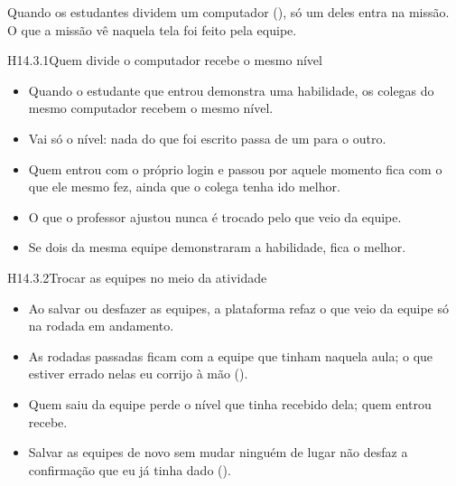 Quando os estudantes dividem um computador (), só um deles entra na
missão. O que a missão vê naquela tela foi feito pela equipe.

\begin{historia}{H14.3.1}{Quem divide o computador recebe o mesmo nível}{\parcial}
\aceite
\begin{itemize}
  \item Quando o estudante que entrou demonstra uma habilidade, os colegas do
    mesmo computador recebem o mesmo nível.
  \item Vai só o nível: nada do que foi escrito passa de um para o outro.
  \item Quem entrou com o próprio login e passou por aquele momento fica com o
    que ele mesmo fez, ainda que o colega tenha ido melhor.
  \item O que o professor ajustou nunca é trocado pelo que veio da equipe.
  \item Se dois da mesma equipe demonstraram a habilidade, fica o melhor.
\end{itemize}
\end{historia}

\begin{historia}{H14.3.2}{Trocar as equipes no meio da atividade}{\parcial}
\aceite
\begin{itemize}
  \item Ao salvar ou desfazer as equipes, a plataforma refaz o que veio da
    equipe só na rodada em andamento.
  \item As rodadas passadas ficam com a equipe que tinham naquela aula; o que
    estiver errado nelas eu corrijo à mão ().
  \item Quem saiu da equipe perde o nível que tinha recebido dela; quem entrou
    recebe.
  \item Salvar as equipes de novo sem mudar ninguém de lugar não desfaz a
    confirmação que eu já tinha dado ().
\end{itemize}
\end{historia}


